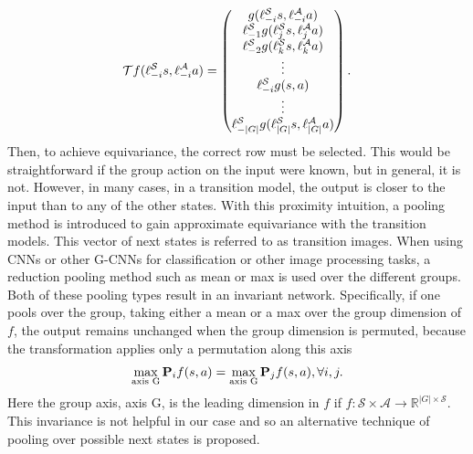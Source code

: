 \begin{equation}\label{eq:g-cnn}
	\mathbf{\mathcal{T}}f(\ell_{-i}^\mathcal{S}s,\ell_{-i}^\mathcal{A}a) = \begin{pmatrix}
		g(\ell_{-i}^\mathcal{S}s,\ell_{-i}^\mathcal{A}a)                 \\
		\ell_{-1}^\mathcal{S}g(\ell_j^\mathcal{S}s,\ell^\mathcal{A}_ja)  \\
		\ell_{-2}^\mathcal{S}g(\ell^\mathcal{S}_ks, \ell^\mathcal{A}_ka) \\
		\vdots                                                           \\
		\ell_{-i}^\mathcal{S}g(s, a)                                     \\
		\vdots                                                           \\
		\ell_{-|G|}^\mathcal{S}g(\ell_{|G|}^\mathcal{S}s, \ell^\mathcal{A}_{|G|}a)
	\end{pmatrix}.
\end{equation}
Then, to achieve equivariance, the correct row must be selected. This would be straightforward if the group action on the input were known, but in general, it is not. However, in many cases, in a transition model, the output is closer to the input than to any of the other states. With this proximity intuition, a pooling method is introduced to gain approximate equivariance with the transition models. This vector of next states is referred to as transition images.
When using CNNs or other G-CNNs for classification or other image processing tasks, a reduction pooling method such as mean or max is used over the different groups. Both of these pooling types result in an invariant network. Specifically, if one pools over the group, taking either a mean or a max over the group dimension of $f$, the output remains unchanged when the group dimension is permuted, because the transformation applies only a permutation along this axis
\begin{equation}
	\max_\text{axis G} \mathbf{P}_i f(s, a) = \max_\text{axis G} \mathbf{P}_j f(s, a), \forall i, j.
\end{equation}
Here the group axis, axis G, is the leading dimension in $f$ if $f: \mathcal{S} \times \mathcal{A} \rightarrow \mathbb{R}^{|G| \times \mathcal{S}}$. This invariance is not helpful in our case and so an alternative technique of pooling over possible next states is proposed.


